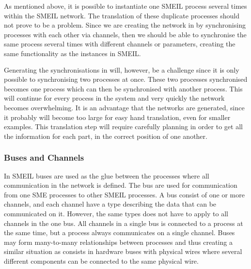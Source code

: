As mentioned above, it is possible to instantiate one SMEIL process several times within the SMEIL network. The translation of these duplicate processes should not prove to be a problem. Since we are creating the network in \cspm{} by synchronising processes with each other via channels, then we should be able to synchronise the same process several times with different channels or parameters, creating the same functionality as the instances in SMEIL.

Generating the synchronisations in \cspm{} will, however, be a challenge since it is only possible to synchronising two processes at once. These two processes synchronised becomes one process which can then be synchronised with another process. This will continue for every process in the system and very quickly the network becomes overwhelming. It is an advantage that the \cspm{} networks are generated, since it probably will become too large for easy hand translation, even for smaller examples.
This translation step will require carefully planning in order to get all the information for each part, in the correct position of one another.

\subsubsection{Buses and Channels}
In SMEIL buses are used as the glue between the processes where all communication in the network is defined. The bus are used for communication from one SME processes to other SMEIL processes. A bus consist of one or more channels, and each channel have a type describing the data that can be communicated on it. However, the same types does not have to apply to all channels in the one bus. All channels in a single bus is connected to a process at the same time, but a process always communicates on a single channel.
Buses may form many-to-many relationships between processes and thus creating a similar situation as consists in hardware buses with physical wires where several different components can be connected to the same physical wire.

